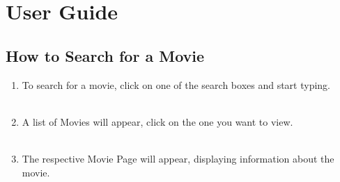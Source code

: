 \documentclass[12pt,a4paper]{article}
\begin{document}
	\section{User Guide}
			\subsection{How to Search for a Movie}
				\begin{enumerate}
					\item To search for a movie, click on one of the search boxes and start typing.\\\\
					\item A list of Movies will appear, click on the one you want to view.\\\\
					\item The respective Movie Page will appear, displaying information about the movie.\\\\

\end{enumerate}
\end{document}
